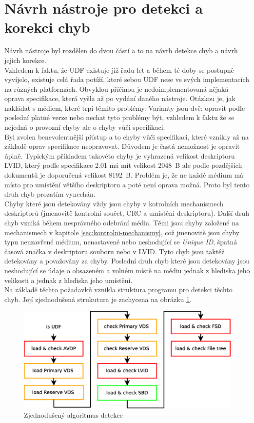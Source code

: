 \section{Návrh nástroje pro detekci a korekci chyb}
\label{sec:navrh}
Návrh nástroje byl rozdělen do dvou částí a to na návrh detekce chyb a návrh jejich korekce.\\
Vzhledem k faktu, že UDF existuje již řadu let a během té doby se postupně vyvíjelo, existuje celá řada potíží, které sebou UDF nese ve svých implementacích na různých platformách. Obvyklou příčinou je nedoimplementovaná nějaká oprava specifikace, která vyšla až po vydání daného nástroje. Otázkou je, jak nakládat s médiem, které trpí těmito problémy. Varianty jsou dvě: opravit podle poslední platné verze nebo nechat tyto problémy být, vzhledem k faktu že se nejedná o provozní chyby ale o chyby vůči specifikaci.\\
Byl zvolen benevolentnější přístup a to chyby vůči specifikaci, které vznikly až na základě oprav specifikace neopravovat. Důvodem je častá nemožnost je opravit úplně. Typickým příkladem takovéto chyby je vyhrazená velikost deskriptoru LVID, který podle specifikace 2.01 má mít velikost 2048~B ale podle pozdějších dokumentů je doporučená velikost 8192~B. Problém je, že ne každé médium má místo pro umístění většího deskriptoru a poté není oprava možná. Proto byl tento druh chyb prozatím vynechán.\\
Chyby které jsou detekovány vždy jsou chyby v kotrolních mechanismech deskriptorů (jmenovitě kontrolní součet, CRC a umístění deskriptoru). Další druh chyb vzniká během nesprávného odebrání média. Těmi jsou chyby založené na mechanismech v kapitole \ref{sec:kontrolni-mechanismy}, což jmenovitě jsou chyby typu neuzavřené médium, nenastavené nebo neshodující se \textit{Unique ID}, špatná časová značka v deskriptoru souboru nebo v LVID. Tyto chyb jsou taktéž detekovány a považovány za chyby. Poslední druh chyb které jsou detekovány jsou neshodující se údaje o obsazeném a volném místě na médiu jednak z hlediska jeho velikosti a jednak z hlediska jeho umístění.\\
Na základě těchto požadavků vznikla struktura programu pro detekci těchto chyb. Její zjednodušená strukutura je zachycena na obrázku \ref{fig:steps-detekce}. 
\begin{figure}[h] 
    \centering
    \includegraphics[scale=0.4]{obrazky/steps1b.eps}
    \caption{Zjednodušený algoritmus detekce}
    \label{fig:steps-detekce}
\end{figure}
